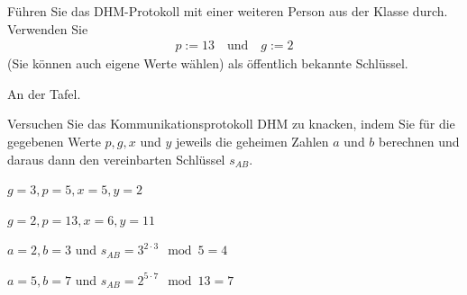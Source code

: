 \begin{myexercise}
	Führen Sie das DHM-Protokoll mit einer weiteren Person aus der Klasse durch. Verwenden Sie
	\begin{align*}
		p := 13 \quad \text{und}\quad g := 2
	\end{align*}
	(Sie können auch eigene Werte wählen) als öffentlich bekannte Schlüssel.
	\begin{myanswer}
		An der Tafel.
	\end{myanswer}
\end{myexercise}

\begin{myexercise}
	Versuchen Sie das Kommunikationsprotokoll DHM zu knacken, indem Sie
	für die gegebenen Werte $p, g, x$ und $y$ jeweils die geheimen Zahlen $a$ und $b$ berechnen und daraus
	dann den vereinbarten Schlüssel $s_{AB}$.
	\begin{aenum}
		\item $g = 3, p = 5, x = 5, y = 2$
		\item $g = 2, p = 13, x = 6, y = 11$
	\end{aenum}
	\begin{myanswer}
		\begin{aenum}
			\item $a = 2, b = 3$ und $s_{AB} = 3^{2\cdot 3}\mod 5 = 4$
			\item $a = 5, b = 7$ und $s_{AB} = 2^{5\cdot 7}\mod 13 = 7$
		\end{aenum}
	\end{myanswer}
\end{myexercise}

\shipoutAnswer
